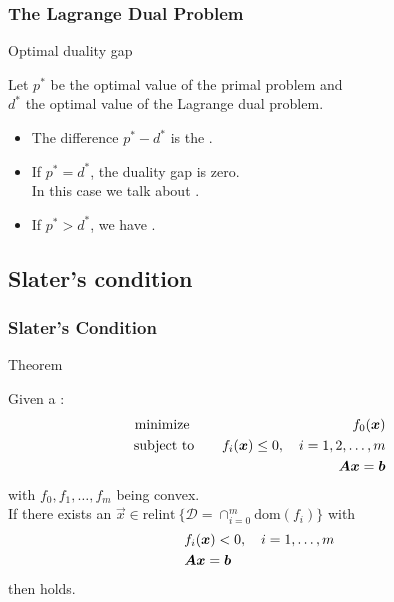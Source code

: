 \begin{frame}
  \frametitle{The Lagrange Dual Problem \cont}
  
  \begin{citeblock}{Optimal duality gap}

    Let  ${p}^*$ be the optimal value of the primal problem and \\
    ${d}^*$ the optimal value of the Lagrange dual problem. \\[.3cm] \pause
    
    \begin{itemize}
      \item The difference $p^*-d^*$ is the . \\[.3cm] \pause
      \item If $p^*=d^*$, the duality gap is zero. \\
        In this case we talk about . \\[.3cm] \pause
      \item If $p^*> d^*$, we have .
     \end{itemize}
  \end{citeblock}
\end{frame}


\subsection{Slater's condition}

\begin{frame}
  \frametitle{Slater's Condition}

  \begin{citeblock}{Theorem}

    Given a :
    \small
    \begin{eqnarray*}
      \mbox{minimize~}  & & \quad f_0({\bm x}) \\
      \mbox{subject to} & & \quad f_i({\bm x}) \leq 0, \quad i=1,2,\dots, m \\
                        & & \quad {\bm A} {\bm x} = {\bm b}
    \end{eqnarray*}
    \normalsize
    with $f_0, f_1, \ldots, f_m$ being convex. \\[.3cm]

    If there exists an $\vec{x} \in \text{relint}~\big\{\mathcal{D} = \cap_{i=0}^m \text{dom}(f_i) \big\}$ with
    \small
    \begin{align*}
      & f_i({\bm x}) < 0, \quad i=1,\dots,m \\
      & {\bm A}{\bm x} = {\bm b} 
    \end{align*}
    then  holds.
  \end{citeblock}
\end{frame}


